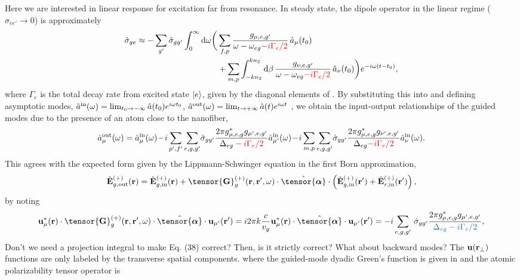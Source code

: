 \documentclass[preprint,aps,pra,onecolumn]{revtex4-1} %
\newcommand{\inp}{{\rm in}}
\newcommand{\out}{{\rm out}}
\newcommand{\poltens}{\hat{\tensor{\boldsymbol{\alpha}}}}
\newcommand{\change}[1]{{\color{RoyalBlue} #1}}
\newcommand{\comment}[1]{{\color{Maroon} #1}}
\newcommand{\error}[1]{{\color{red} #1}}
\begin{document}
Here we are interested in linear response for excitation far from resonance.  In steady state, the dipole 
operator in the linear regime ($\hat{\sigma}_{ee'} \rightarrow 0 $) is approximately
\begin{align}
\hat{\sigma}_{ge} \approx -\sum_{g'} \hat{\sigma}_{gg'}\int_0^{\infty}\mathrm{d}\omega \bigg( & \sum_{f,p}  
\frac{g_{\mu, e,g'}}{\omega-\omega_{eg} \error{- i \Gamma_{e}/2 } }\, \hat{a}_\mu (t_0) \\
	&+\sum_{m,p} \int_{-kn_2}^{kn_2}\mathrm{d}\beta \, \frac{g_{\nu, e,g'}}{\omega-\omega_{eg}\error{- i \Gamma_{e}/2 }} \,\hat{a}_\nu (t_0)  \bigg)e^{-i\omega (t-t_0)} , \nn
\end{align}
where $\Gamma_e$ is the total decay rate from excited state $\lvert{e}\rangle$, given by the diagonal elements of .  By substituting this into  and defining asymptotic modes, \comment{ $\hat{a}^{\inp}(\omega) = \lim_{t_0\rightarrow -\infty} \hat{a}(t_0) e^{i\omega t_0}$, $\hat{a}^{\out}(\omega) = \lim_{t\rightarrow +\infty} \hat{a}(t) e^{i\omega t}$ \cite{fan_input-output_2010} }, we obtain the input-output relationships of the guided modes due to the presence of an atom close to the nanofiber,
\begin{equation}
\hat{a}^{\out}_\mu (\omega) = \hat{a}^{\inp}_\mu (\omega) \!-\! i\sum_{p',f'} 
\sum_{e,g,g'}\!\hat{\sigma}_{gg'}\frac{2\pi g_{\mu,e,g}^* 
g_{\mu',e,g'}}{ \Delta_{eg} -  \error{i \Gamma_{e}/2 }}\hat{a}^{\inp}_{\mu'}(\omega) \!-\! i\sum_{m,p} 
\sum_{e,g,g'}\!\hat{\sigma}_{gg'}\frac{2\pi  g_{\mu,e,g}^* 
g_{\nu',e,g'}}{ \Delta_{eg} \error{ - i \Gamma_{e}/2 }}\hat{a}^{\inp}_{\nu}(\omega).
\end{equation}
This agrees with the expected form given by the Lippmann-Schwinger equation in the first Born 
approximation,
\begin{equation} \label{Eq::IOScatteredField}
\hat{\mathbf{E}}^{(+)}_{g,\out}(\br)=\hat{\mathbf{E}}^{(+)}_{g, 
\inp}(\br)+\tensor{\mathbf{G}}_g^{(+)}(\br,\br',\omega)\cdot \poltens \cdot 
\left(\hat{\mathbf{E}}^{(+)}_{g, \inp}(\br')+\hat{\mathbf{E}}^{(+)}_{r, \inp}(\br')\right),
\end{equation}
by noting
\comment{
\begin{equation}
\mathbf{u}^*_{\mu} (\br)\cdot \tensor{\mathbf{G}}_g^{(+)}(\br,\br',\omega)\cdot 
\poltens \cdot \mathbf{u}_{\mu'} (\br') = i 2\pi k\frac{c}{v_g} \mathbf{u}^*_\mu 
 (\br) \cdot \poltens \cdot \mathbf{u}_{\mu'} (\br') = - i \sum_{e,g,g'}\!\ 
 \hat{\sigma}_{gg'} \frac{2\pi g_{\mu,e,g}^* g_{\mu',e,g'}}{\change{ \Delta_{eg} - i \Gamma_{e}/2 }}, 
\end{equation}
 Don't we need a projection integral to make Eq. (38) correct?  Then, is it strictly correct? What about backward modes? The $\mathbf{u}(\mathbf{r}_\perp)$ functions are only labeled by the transverse spatial components.} where the guided-mode dyadic Green's function is given in  and the atomic polarizability tensor operator is
\end{document}
